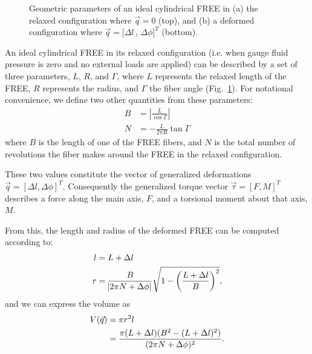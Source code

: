 \begin{figure}
    \centering
    \caption{Geometric parameters of an ideal cylindrical FREE in (a) the relaxed configuration where $\vec{q}=0$ (top), and (b) a deformed configuration where ${\vec{q}=\lbrack \Delta l \hspace{2pt} , \hspace{2pt} \Delta \phi \rbrack^T}$ (bottom).}
    \label{fig:FREEparams}
\end{figure}

An ideal cylindrical FREE in its relaxed configuration (i.e. when gauge fluid pressure is zero and no external loads are applied) can be described by a set of three parameters, $L$, $R$, and $\Gamma$, where $L$ represents the relaxed length of the FREE, $R$ represents the radius, and $\Gamma$ the fiber angle (Fig.~\ref{fig:FREEparams}). 
For notational convenience, we define two other quantities from these parameters:
\begin{align}
	B &= \left| \frac{L}{\cos{\Gamma}} \right| \\
	N &= - \frac{L}{2 \pi R} \tan{\Gamma}
\end{align}
where $B$ is the length of one of the FREE fibers, and $N$ is the total number of revolutions the fiber makes around the FREE in the relaxed configuration. 

These two values constitute the vector of generalized deformations $\vec{q} = \left[ \Delta l, \Delta \phi \right]^T$.
Consequently the generalized torque vector $\vec{\tau} = \left[ F, M \right]^T$ describes a force along the main axis, $F$, and a torsional moment about that axis, $M$.

From this, the length and radius of the deformed FREE can be computed according to:
\begin{align}
    l &= L + \Delta l \label{eq:l} \\
	r &= \frac{B}{\abs{2 \pi N + \Delta \phi}} \sqrt{1 - \left( \frac{L+\Delta l}{B} \right)^2}, \label{eq:r}
\end{align}
and we can express the volume as
\begin{align}
	V(\vec{q}) &= \pi r^2 l \notag \\ 
	&= \frac{\pi (L+\Delta l) (B^2 - (L+\Delta l)^2)}{(2 \pi N + \Delta \phi)^2}  \label{eq:V}.
\end{align}

